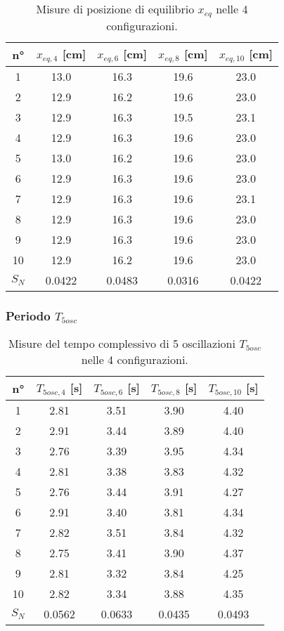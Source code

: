\documentclass[titlepage]{article}
\numberwithin{equation}{section}
\numberwithin{figure}{section}
\numberwithin{table}{section}
\begin{document}
\begin{table}[ht]
  \centering
  \begin{tabular}{ccccc}
    \toprule
    n° & $x_{eq,4}$ [\si{\centi\metre}] & $x_{eq,6}$ [\si{\centi\metre}] & $x_{eq,8}$ [\si{\centi\metre}] & $x_{eq,10}$ [\si{\centi\metre}] \\
    \midrule
    1  & 13.0 & 16.3 & 19.6 & 23.0 \\
    2  & 12.9 & 16.2 & 19.6 & 23.0 \\
    3  & 12.9 & 16.3 & 19.5 & 23.1 \\
    4  & 12.9 & 16.3 & 19.6 & 23.0 \\
    5  & 13.0 & 16.2 & 19.6 & 23.0 \\
    6  & 12.9 & 16.3 & 19.6 & 23.0 \\
    7  & 12.9 & 16.3 & 19.6 & 23.1 \\
    8  & 12.9 & 16.3 & 19.6 & 23.0 \\
    9  & 12.9 & 16.3 & 19.6 & 23.0 \\
    10 & 12.9 & 16.2 & 19.6 & 23.0 \\
    \midrule
    $S_N$ & 0.0422 & 0.0483 & 0.0316 & 0.0422 \\
    \bottomrule
  \end{tabular}
  \caption{Misure di posizione di equilibrio $x_{eq}$ nelle 4 configurazioni.}
\end{table}

\pagebreak
\subsubsection{Periodo \texorpdfstring{$T_{5osc}$}{T5osc}}

\begin{table}[ht]
  \centering
  \begin{tabular}{ccccc}
    \toprule
    n° & $T_{5osc,4}$ [\si{\second}] & $T_{5osc,6}$ [\si{\second}] & $T_{5osc,8}$ [\si{\second}] & $T_{5osc,10}$ [\si{\second}] \\
    \midrule
    1  & 2.81 & 3.51 & 3.90 & 4.40 \\
    2  & 2.91 & 3.44 & 3.89 & 4.40 \\
    3  & 2.76 & 3.39 & 3.95 & 4.34 \\
    4  & 2.81 & 3.38 & 3.83 & 4.32 \\
    5  & 2.76 & 3.44 & 3.91 & 4.27 \\
    6  & 2.91 & 3.40 & 3.81 & 4.34 \\
    7  & 2.82 & 3.51 & 3.84 & 4.32 \\
    8  & 2.75 & 3.41 & 3.90 & 4.37 \\
    9  & 2.81 & 3.32 & 3.84 & 4.25 \\
    10 & 2.82 & 3.34 & 3.88 & 4.35 \\
    \midrule
    $S_N$ & 0.0562 & 0.0633 & 0.0435 & 0.0493 \\
    \hline
  \end{tabular}
  \caption{Misure del tempo complessivo di 5 oscillazioni $T_{5osc}$ nelle 4 configurazioni.}
\end{table}
\end{document}
